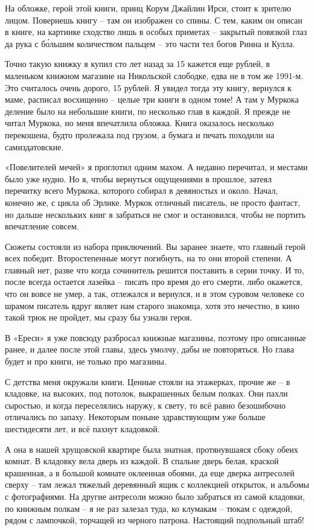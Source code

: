 На обложке, герой этой книги, принц Корум Джайлин Ирси, стоит к зрителю лицом. Повернешь книгу – там он изображен со спины. С тем, каким он описан в книге, на картинке сходство лишь в особых приметах – закрытый повязкой глаз да рука с б\'ольшим количеством пальцем – это части тел богов Ринна и Кулла.

Точно такую книжку я купил сто лет назад за 15 кажется еще рублей, в маленьком книжном магазине на Никольской слободке, едва не в том же 1991-м. Это считалось очень дорого, 15 рублей. Я увидел тогда эту книгу, вернулся к маме, расписал восхищенно – целые три книги в одном томе! А там у Муркока деление было на небольшие книги, по несколько глав в каждой. Я прежде не читал Муркока, но меня впечатлила обложка. Книга оказалось несколько перекошена, будто пролежала под грузом, а бумага и печать походили на самиздатовские.

«Повелителей мечей» я проглотил одним махом. А недавно перечитал, и местами было уже нудно. Но я, чтобы вернуться ощущениями в прошлое, затеял перечитку всего Муркока, которого собирал в девяностых и около. Начал, конечно же, с цикла об Эрлике. Муркок отличный писатель, не просто фантаст, но дальше нескольких книг я забраться не смог и остановился, чтобы не портить впечатление совсем. 

Сюжеты состояли из набора приключений. Вы заранее знаете, что главный герой всех победит. Второстепенные могут погибнуть, на то они второй степени. А главный нет, разве что когда сочинитель решится поставить в серии точку. И то, после всегда остается лазейка – писать про время до его смерти, либо окажется, что он вовсе не умер, а так, отлежался и вернулся, и в этом суровом человеке со шрамом писатель вдруг являет нам старого знакомца, хотя это нечестно, в кино такой трюк не пройдет, мы сразу бы узнали героя.

В «Ереси» я уже повсюду разбросал книжные магазины, поэтому про описанные ранее, и далее после этой главы, здесь умолчу, дабы не повторяться. Но глава будет и про книги, не только про магазины.

С детства меня окружали книги. Ценные стояли на этажерках, прочие же – в кладовке, на высоких, под потолок, выкрашенных белым полках. Они пахли сыростью, и когда переселялись наружу, к свету, то всё равно безошибочно отличались по запаху. Некоторым поныне здравствующим уже больше шестидесяти лет, и всё пахнут кладовкой.

А она в нашей хрущовской квартире была знатная, протянувшаяся сбоку обеих комнат. В кладовку вела дверь из каждой. В спальне дверь белая, краской крашенная, а в большой комнате оклеенная обоями, да еще дверка антресолей сверху – там лежал тяжелый деревянный ящик с коллекцией открыток, и альбомы с фотографиями. На другие антресоли можно было забраться из самой кладовки, по книжным полкам – я не раз залезал туда, ко клумакам – тюкам с одеждой, рядом с лампочкой, торчащей из черного патрона. Настоящий подпольный штаб!

